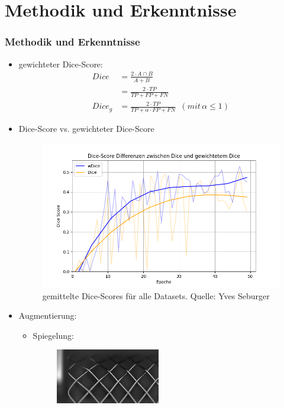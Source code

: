 \documentclass{beamer}
\begin{document}
\section{Methodik und Erkenntnisse}
\begin{frame}[allowframebreaks]
\frametitle{Methodik und Erkenntnisse}
\begin{itemize}
    \item gewichteter Dice-Score:\\
    \begin{equation}
        \begin{split}
            Dice &= \frac{2 \cdot A \cap B}{A + B}\\
            &= \frac{2 \cdot TP}{TP + FP + FN}\\
            Dice_g &= \frac{2 \cdot TP}{TP + \alpha \cdot FP + FN}
            \,\,\,(mit\, \alpha \leq 1)
        \end{split}
    \end{equation}
    \framebreak
    \item Dice-Score vs. gewichteter Dice-Score
    \begin{figure}
        \includegraphics[width=0.9\linewidth]{Bilder/Mir_Set_true_vs_false.png}
        \caption{gemittelte Dice-Scores für alle Datasets. \scriptsize{Quelle: Yves Seburger}}
    \end{figure}
    \item Augmentierung:
    \begin{itemize}
        \item Spiegelung:
        \begin{figure}
            \includegraphics[height=2.4cm]{Bilder/Augmentation/mlr.jpg}

\end{figure}
\end{itemize}
\end{itemize}
\end{frame}
\end{document}
